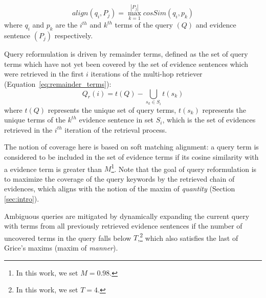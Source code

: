 \begin{equation}
\label{eq:align_function}
align(q_i, P_j) = \max_{k=1}^{|P_j|} cosSim(q_i, p_k)
\end{equation}
where $q_i$ and $p_k$ are the $i^{th}$ and $k^{th}$ terms of the query $(Q)$ and evidence sentence $(P_j)$ respectively.

Query reformulation is driven by remainder terms, defined as the set of query terms which have not yet been covered by the set of evidence sentences which were retrieved in the first $i$ iterations of the multi-hop retriever (Equation~\ref{eq:remainder_terms}): 
\begin{equation}
\label{eq:remainder_terms}
Q_r(i) = t(Q) - \bigcup_{s_k \in S_i} t(s_k)
\end{equation}
where $t(Q)$ represents the unique set of query terms, $t(s_k)$ represents the unique terms of the $k^{th}$ evidence sentence in set $S_i$, which is the set of evidences retrieved in the $i^{th}$ iteration of the retrieval process.

The notion of coverage here is based on soft matching alignment: a query term is considered to be included in the set of evidence terms if its cosine similarity with a evidence term is greater than $M$\footnote{In this work, we set $M=0.98$.}. Note that the goal of query reformulation is to maximize the coverage of the query keywords by the retrieved chain of evidences, which aligns with the notion of the maxim of \textit{quantity} (Section \ref{sec:intro}).

Ambiguous queries are mitigated by dynamically expanding the current query with terms from all previously retrieved evidence sentences if the number of uncovered terms in the query falls below $T$,\footnote{In this work, we set $T=4$.} which also satisfies the last of Grice's maxims (maxim of \textit{manner}).